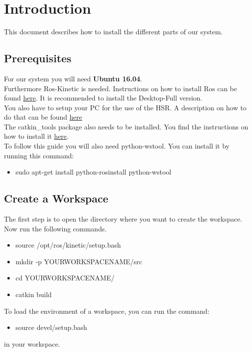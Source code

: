 \documentclass[main.tex]{subfiles}
\begin{document}
\newpage
	\section{Introduction}
	This document describes how to install the different parts of our system.
	
	\subsection{Prerequisites}
	
	For our system you will need \textbf{Ubuntu 16.04}.\\
	Furthermore Ros-Kinetic is needed. Instructions on how to install Ros can be found \href{http://wiki.ros.org/kinetic/Installation/Ubuntu}{here}. It is recommended to install the Desktop-Full version.\\
	You also have to setup your PC for the use of the HSR.
	A description on how to do that can be found \href{https://docs.hsr.io/manual_en/howto/pc_install.html}{here}\\
	The catkin\_tools package also needs to be installed. You find the instructions on how to install it \href{https://catkin-tools.readthedocs.io/en/latest/installing.html}{here}.\\
	To follow this guide you will also need python-wstool.
	You can install it by running this command:
	\begin{itemize}
	\item sudo apt-get install python-rosinstall python-wstool
	\end{itemize}
	
	
	\subsection{Create a Workspace}
	The first step is to open the directory where you want to create the workspace.\\
	Now run the following commands.
	\begin{itemize}
	\item source /opt/ros/kinetic/setup.bash
	\item mkdir -p YOURWORKSPACENAME/src
	\item cd YOURWORKSPACENAME/
	\item catkin build 
	\end{itemize}
	
	To load the environment of a workspace, you can run the command:
	\begin{itemize}
	\item source devel/setup.bash
	\end{itemize}
	in your workspace.
	
	
\end{document}
